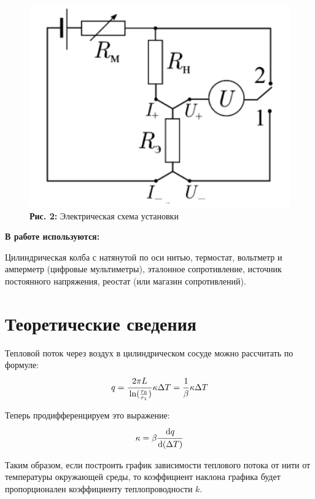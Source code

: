\documentclass[12pt,a4paper]{scrartcl}
\begin{document}
\begin{center}
\begin{figure}[h]
\begin{minipage}{0.43\linewidth}
\begin{center}
				\end{center}
			\end{minipage}
			\begin{minipage}{0.57\linewidth}
				\begin{center}
					\includegraphics[scale=0.1]{PIC_2.png}
					\\\textbf{Рис. 2:} Электрическая схема установки
				\end{center}
			\end{minipage}
		\end{figure}
	\end{center}
		
	\textbf{В работе используются:}
	
	Цилиндрическая колба с натянутой по оси нитью, термостат, вольтметр и амперметр (цифровые мультиметры), эталонное сопротивление, источник постоянного напряжения, реостат (или магазин сопротивлений).
	
	\section{Теоретические сведения}
	Тепловой поток через воздух в цилиндрическом сосуде можно рассчитать по формуле:
	$$q = \dfrac{\strut 2\pi L}{\strut \ln (\frac{r_0}{r_1})}\kappa \Delta T = \dfrac{\strut 1}{\strut \beta}\kappa \Delta T$$
	
	Теперь продифференцируем это выражение:
	$$\kappa = \beta \dfrac{\strut \mathrm{d} q}{\strut \mathrm{d} (\Delta T)}$$
	
	Таким образом, если построить график зависимости теплового потока от нити от температуры окружающей среды, то коэффициент наклона графика будет пропорционален коэффициенту теплопроводности $k$.
	
\end{document}
